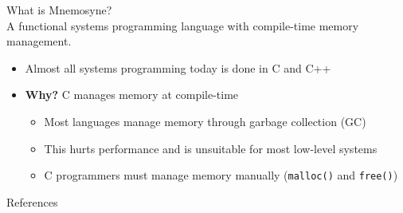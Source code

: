\documentclass{beamer}
\begin{document}
\begin{frame}
\huge What is Mnemosyne? \normalsize \\
A functional systems programming language with \alert<1->{compile-time memory management}.
\begin{itemize}
    \item Almost all systems programming today is done in C and C++
    \item<2-> \textbf{Why?} C manages memory at compile-time
    \begin{itemize}
        \item<3-> Most languages manage memory through garbage collection (GC)~\cite{Bartley:2003:GC:1074100.1074419}
        \item<3-> This hurts performance and is unsuitable for most low-level systems
        \item<3-> C programmers must manage memory manually (\texttt{malloc()} and \texttt{free()})
    \end{itemize}
\end{itemize}
\end{frame}

\begin{frame}
    \huge References \normalsize \\

    \printbibliography
\end{frame}
\end{document}
